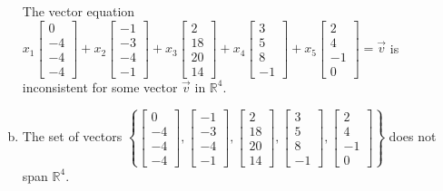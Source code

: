 \begin{exerciseAnswer}
\begin{enumerate}[(a)]
\begin{center}\begin{minipage}{0.8\textwidth}
 The vector equation \( x_{1} \left[\begin{array}{c}
0 \\
-4 \\
-4 \\
-4
\end{array}\right] + x_{2} \left[\begin{array}{c}
-1 \\
-3 \\
-4 \\
-1
\end{array}\right] + x_{3} \left[\begin{array}{c}
2 \\
18 \\
20 \\
14
\end{array}\right] + x_{4} \left[\begin{array}{c}
3 \\
5 \\
8 \\
-1
\end{array}\right] + x_{5} \left[\begin{array}{c}
2 \\
4 \\
-1 \\
0
\end{array}\right] =\vec{v}\) is inconsistent for some vector \(\vec{v}\) in \(\mathbb{R}^4\). 
\end{minipage}\end{center}
    
\item  The set of vectors \( \left\{ \left[\begin{array}{c}
0 \\
-4 \\
-4 \\
-4
\end{array}\right] , \left[\begin{array}{c}
-1 \\
-3 \\
-4 \\
-1
\end{array}\right] , \left[\begin{array}{c}
2 \\
18 \\
20 \\
14
\end{array}\right] , \left[\begin{array}{c}
3 \\
5 \\
8 \\
-1
\end{array}\right] , \left[\begin{array}{c}
2 \\
4 \\
-1 \\
0
\end{array}\right] \right\} \) does not span \(\mathbb{R}^4\). 
\end{enumerate}
    
\end{exerciseAnswer}
    
